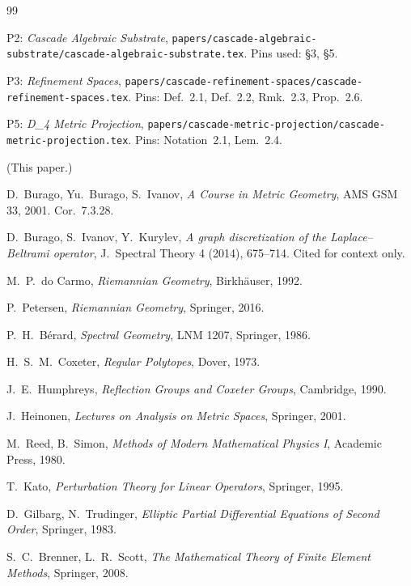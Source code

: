 \documentclass[11pt, a4paper]{amsart}
\theoremstyle{definition}
\begin{document}
\begin{thebibliography}{99}

P2: \emph{Cascade Algebraic Substrate},
\texttt{papers/cascade-algebraic-substrate/cascade-algebraic-substrate.tex}.
Pins used: \S 3, \S 5.

P3: \emph{Refinement Spaces},
\texttt{papers/cascade-refinement-spaces/cascade-refinement-spaces.tex}.
Pins: Def.~2.1, Def.~2.2, Rmk.~2.3, Prop.~2.6.

P5: \emph{D_4 Metric Projection},
\texttt{papers/cascade-metric-projection/cascade-metric-projection.tex}.
Pins: Notation~2.1, Lem.~2.4.

(This paper.)

D.~Burago, Yu.~Burago, S.~Ivanov, \emph{A Course in Metric
Geometry}, AMS GSM 33, 2001. Cor.~7.3.28.

D.~Burago, S.~Ivanov, Y.~Kurylev, \emph{A graph discretization of
the Laplace--Beltrami operator}, J.~Spectral Theory 4 (2014),
675--714. Cited for context only.

M.~P.~do Carmo, \emph{Riemannian Geometry}, Birkh\"{a}user, 1992.

P.~Petersen, \emph{Riemannian Geometry}, Springer, 2016.

P.~H.~B\'{e}rard, \emph{Spectral Geometry}, LNM 1207, Springer,
1986.

H.~S.~M.~Coxeter, \emph{Regular Polytopes}, Dover, 1973.

J.~E.~Humphreys, \emph{Reflection Groups and Coxeter Groups},
Cambridge, 1990.

J.~Heinonen, \emph{Lectures on Analysis on Metric Spaces},
Springer, 2001.

M.~Reed, B.~Simon, \emph{Methods of Modern Mathematical Physics
I}, Academic Press, 1980.

T.~Kato, \emph{Perturbation Theory for Linear Operators},
Springer, 1995.

D.~Gilbarg, N.~Trudinger, \emph{Elliptic Partial Differential
Equations of Second Order}, Springer, 1983.

S.~C.~Brenner, L.~R.~Scott, \emph{The Mathematical Theory of
Finite Element Methods}, Springer, 2008.

\end{thebibliography}
\end{document}
